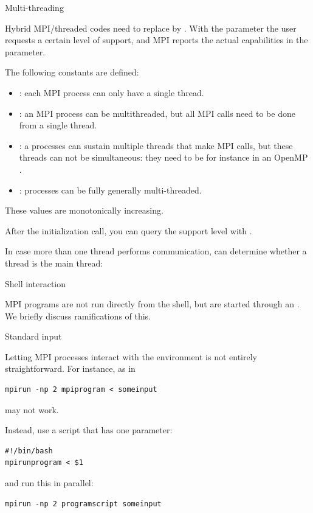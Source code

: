  {Multi-threading}
\label{sec:ref:mpi-thread}

Hybrid MPI/threaded codes need to replace 
by .
With the  parameter the user requests a certain level of support,
and MPI reports the actual capabilities in the  parameter.

The following constants are defined:
\begin{itemize}
\item {}: each MPI process can only have
  a single thread.
\item {}: an MPI process can be
  multithreaded, but all MPI calls need to be done from a single
  thread.
\item {}: a processes can sustain
  multiple threads that make MPI calls, but these threads can not be
  simultaneous: they need to be for instance in an OpenMP
  .
\item {}: processes can be fully
  generally multi-threaded.
\end{itemize}
These values are monotonically increasing.

After the initialization call, you can query the support level
with .


In case more than one thread performs communication, 
can determine whether a thread is the main thread:

 {Shell interaction}

MPI programs are not run directly from the shell, but are started
through an . We briefly discuss
ramifications of this.

 {Standard input}
\label{sec:mpi-stdin}

Letting MPI processes interact with the environment is not entirely
straightforward.
For instance,
%
as in
\begin{verbatim}
mpirun -np 2 mpiprogram < someinput
\end{verbatim}
may not work.

Instead, use a script  that has one parameter:
\begin{verbatim}
#!/bin/bash
mpirunprogram < $1
\end{verbatim}
and run this in parallel:
\begin{verbatim}
mpirun -np 2 programscript someinput
\end{verbatim}

